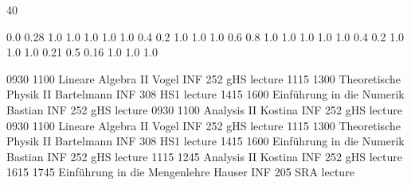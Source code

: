 \documentclass[a4paper,10pt]{report}
\begin{document}
\thispagestyle{empty}
\begin{landscape}
\noindent{}

\setslotsize{2.8cm}{0.3cm}
 {40}
\settextframe{0.8mm}

\seteventcornerradius{0pt}


			{0.0} 	{0.28}	{1.0} 	{1.0}	{1.0}	{1.0}
 	{1.0} 	{0.4} 	{0.2} 	{1.0}	{1.0}	{1.0}
   		{0.6} 	{0.8} 	{1.0} 	{1.0}	{1.0}	{1.0}
 		{1.0} 	{0.4} 	{0.2} 	{1.0}	{1.0}	{1.0}
       		{0.21}	{0.5} 	{0.16}	{1.0}	{1.0}	{1.0}

\begin{timetable}
   {0930} {1100} {Lineare Algebra II}             {Vogel}      	  {INF 252 gHS} 		{lecture}
   {1115} {1300} {Theoretische Physik II}         {Bartelmann}    {INF 308 HS1}     {lecture}
   {1415} {1600} {Einführung in die Numerik}      {Bastian}      	{INF 252 gHS}    	{lecture}
   {0930} {1100} {Analysis II}     							  {Kostina}     	{INF 252 gHS}     {lecture}
   {0930} {1100} {Lineare Algebra II}             {Vogel}         {INF 252 gHS} 		{lecture}
   {1115} {1300} {Theoretische Physik II} 		    {Bartelmann}   	{INF 308 HS1}    	{lecture}
   {1415} {1600} {Einführung in die Numerik}      {Bastian}       {INF 252 gHS}    	{lecture}
   {1115} {1245} {Analysis II}      		   				{Kostina}       {INF 252 gHS}    	{lecture}
   {1615} {1745} {Einführung in die Mengenlehre}  {Hauser}        {INF 205 SRA}     {lecture}        
\end{timetable}
\end{landscape}
\end{document}
